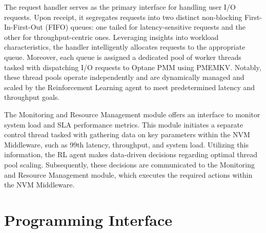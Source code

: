 The request handler serves as the primary interface for handling user I/O requests. Upon receipt, it segregates requests into two distinct non-blocking First-In-First-Out (FIFO) queues: one tailed for latency-sensitive requests and the other for throughput-centric ones. Leveraging insights into workload characteristics, the handler intelligently allocates requests to the appropriate queue. Moreover, each queue is assigned a dedicated pool of worker threads tasked with dispatching I/O requests to Optane PMM using PMEMKV. Notably, these thread pools operate independently and are dynamically managed and scaled by the Reinforcement Learning agent to meet predetermined latency and throughput goals.

The Monitoring and Resource Management module offers an interface to monitor system load and SLA performance metrics. This module initiates a separate control thread tasked with gathering data on key parameters within the NVM Middleware, such as 99th latency, throughput, and system load. Utilizing this information, the RL agent makes data-driven decisions regarding optimal thread pool scaling. Subsequently, these decisions are communicated to the Monitoring and Resource Management module, which executes the required actions within the NVM Middleware.

\section{Programming Interface}

